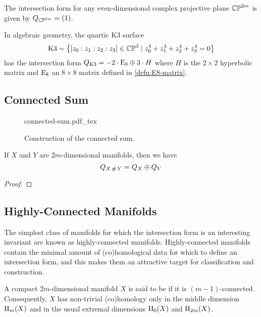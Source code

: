 \begin{example}
	The intersection form for any even-dimensional complex projective plane $\mathbb{CP}^{2m}$ is given by $Q_{\mathbb{CP}^{2m}}=(1)$.
\end{example}

\begin{example}
	In algebraic geometry, the quartic K3 surface
	\[
		\textrm{K3} = \left\{ [z_0 : z_1 : z_2 : z_3]\in \mathbb{CP}^3 \mid z_0^4 + z_1^4+z_2^4 + z_3^4=0\right\}
	\]
	has the intersection form $Q_{\textrm{K3}} = -2\cdot {\operatorname{E}}_8 \oplus 3\cdot H$ where $H$ is the $2\times 2$ hyperbolic matrix and ${\operatorname{E}}_8$ an $8\times 8$ matrix defined in \cref{defn:E8-matrix}.
\end{example}

\subsection{Connected Sum}


\begin{figure}[ht]
	\centering
	{connected-sum.pdf_tex}
	\caption{Construction of the connected sum.}\label{fig:connected-sum}
\end{figure}

\begin{proposition}\label{prop:connected-sum-intersection-form}
	If $X$ and $Y$ are $2m$-dimensional manifolds, then we have
	\[Q_{X\,\#\,Y} = Q_X\oplus Q_Y\]
\end{proposition}
\begin{proof}
\end{proof}

\subsection{Highly-Connected Manifolds}

The simplest class of manifolds for which the intersection form is an interesting invariant are known as highly-connected manifolds. Highly-connected manifolds contain the minimal amount of (co)homological data for which to define an intersection form, and this makes them an attractive target for classification and construction.

\begin{definition}
	A compact $2m$-dimensional manifold $X$ is said to be  if it is $(m-1)$-connected. Consequently, $X$ has non-trivial (co)homology only in the middle dimension $\operatorname{H}_m(X)$ and in the usual extremal dimensions $\operatorname{H}_0(X)$ and $\operatorname{H}_{2m}(X)$.
\end{definition}


